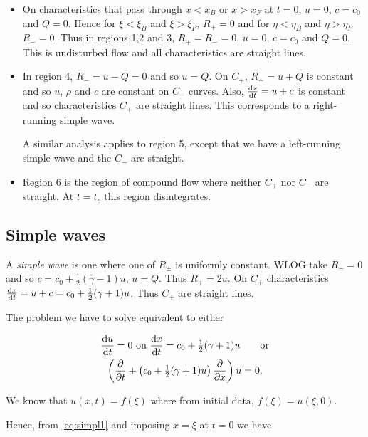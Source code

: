 \documentclass{notes}
\begin{document}
\vspace{1.5in}

\begin{itemize}
\item On characteristics that pass through $x < x_B$ or $x > x_F$ at
$t=0$, $u=0$, $c=c_0$ and $Q=0$.  Hence for $\xi < \xi_B$ and
$\xi > \xi_F$, $R_+ = 0$ and for $\eta < \eta_B$ and $\eta > \eta_F$
$R_- = 0$.  Thus in regions 1,2 and 3, $R_+ = R_- = 0$, $u = 0$,
$c = c_0$ and $Q = 0$.  This is undisturbed flow and all characteristics are
straight lines.

\item  In region 4, $R_- = u - Q = 0$ and so $u = Q$.  On $C_+$,
$R_+ = u + Q$ is constant and so $u$, $\rho$ and $c$ are constant on $C_+$
curves.  Also, $\frac{\mathrm{d} x}{\mathrm{d} t} = u+c$ is constant and so characteristics
$C_+$ are straight lines.  This corresponds to a right-running simple wave.

A similar analysis applies to region 5, except that we have a left-running
simple wave and the $C_-$ are straight.

\item Region 6 is the region of compound flow where neither $C_+$
nor $C_-$ are straight.  At $t=t_c$ this region disintegrates.
\end{itemize}

\subsection{Simple waves}

A \emph{simple wave} is one where one of $R_\pm$ is uniformly constant.
WLOG take $R_- = 0$ and so $c = c_0 + \tfrac{1}{2} (\gamma - 1)u$,
$u = Q$.  Thus $R_+ = 2 u$.  On $C_+$ characteristics
$\frac{\mathrm{d} x}{\mathrm{d} t} = u + c = c_0 + \tfrac{1}{2}(\gamma + 1)u$.  Thus
$C_+$ are straight lines.

The problem we have to solve equivalent to either

\begin{gather}
\frac{\mathrm{d} u}{\mathrm{d} t} = 0 \text{ on } \frac{\mathrm{d} x}{\mathrm{d} t} = c_0 + \tfrac{1}{2} (\gamma + 1) u
\label{eq:simpl1} \qquad \text{or} \\
\left( \frac{\partial }{\partial t} + \left( c_0 + \tfrac{1}{2} (\gamma + 1)u\right)
\frac{\partial }{\partial x} \right)u = 0. \label{eq:simpl2}
\end{gather}

We know that $u(x,t) = f(\xi)$ where from initial data, $f(\xi) = u(\xi,0)$.

Hence, from \eqref{eq:simpl1} and imposing $x=\xi$ at $t=0$ we have
\end{document}
